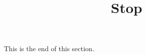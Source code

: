\documentclass[handout]{ximera}
\title{Stop}
\begin{document}
\begin{abstract} %
\end{abstract}

\maketitle

This is the end of this section.
\end{document}
